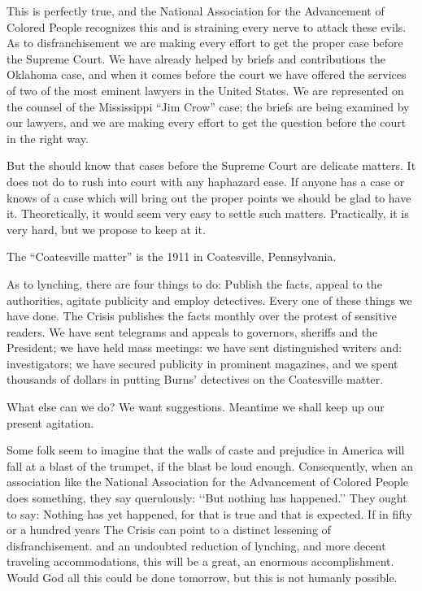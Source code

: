\documentclass[letterpaper,10pt,english]{jupyterBook}
\begin{document}
\sphinxAtStartPar
This is perfectly true, and the National Association for the Advancement of Colored People recognizes this and is straining every nerve to attack these evils. As to disfranchisement we are making every effort to get the proper case before the Supreme Court. We have already helped by briefs and contributions the Oklahoma case, and when it comes before the court we have offered the services of two of the most eminent lawyers in the United States. We are represented on the counsel of the Mississippi “Jim Crow” case; the briefs are being examined by our lawyers, and we are making every effort to get the question before the court in the right way.

\sphinxAtStartPar
But the  should know that cases before the Supreme Court are delicate matters. It does not do to rush into court with any haphazard ease. If anyone has a case or knows of a case which will bring out the proper points we should be glad to have it. Theoretically, it would seem very easy to settle such matters. Practically, it is very hard, but we propose to keep at it.

\begin{sphinxShadowBox}
\sphinxstylesidebartitle{}

\sphinxAtStartPar
The “Coatesville matter” is the 1911  in Coatesville, Pennsylvania.
\end{sphinxShadowBox}

\sphinxAtStartPar
As to lynching, there are four things to do: Publish the facts, appeal to the authorities, agitate publicity and employ detectives. Every one of these things we have done. The Crisis publishes the facts monthly over the protest of sensitive readers. We have sent telegrams and appeals to governors, sheriffs and the President; we have held mass meetings: we have sent distinguished writers and: investigators; we have secured publicity in prominent magazines, and we spent thousands of dollars in putting Burns’ detectives on the Coatesville matter.

\sphinxAtStartPar
What else can we do? We want suggestions. Meantime we shall keep up our present agitation.

\sphinxAtStartPar
Some folk seem to imagine that the walls of caste and prejudice in America will fall at a blast of the trumpet, if the blast be loud enough. Consequently, when an association like the National Association for the Advancement of Colored People does something, they say querulously: ‘‘But nothing has happened.’’ They ought to say: Nothing has yet happened, for that is true and that is expected. If in fifty or a hundred years The Crisis can point to a distinct lessening of disfranchisement. and an undoubted reduction of lynching, and more decent traveling accommodations, this will be a great, an enormous accomplishment. Would God all this could be done to\sphinxhyphen{}morrow, but this is not humanly possible.
\end{document}
